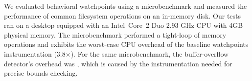 \documentclass[letterpaper,twocolumn,10pt]{article}
\begin{document}
We evaluated behavioral watchpoints using a microbenchmark and measured the performance of common filesystem operations on an in-memory disk. Our tests ran on a desktop equipped with an Intel\textregistered\ Core\texttrademark\ 2 Duo 2.93 GHz CPU with 4GB physical memory. %
The microbenchmark performed a tight-loop of memory operations and exhibits the worst-case CPU overhead of the baseline watchpoints instrumentation (3.8{\footnotesize$\times$}). For the same microbenchmark, the buffer-overflow detector's overhead was , which is caused by the instrumentation needed for precise bounds checking.




\end{document}
